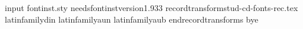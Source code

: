 input fontinst.sty
needsfontinstversion{1.933}
recordtransforms{tud-cd-fonts-rec.tex}
latinfamily{din}{}
latinfamily{aun}{}
latinfamily{aub}{}
endrecordtransforms
bye

